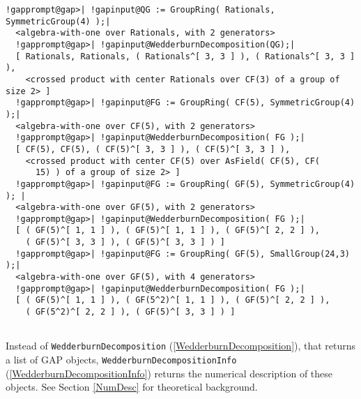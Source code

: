 \documentclass[a4paper,11pt]{report}
\begin{document}
{{\begin{Verbatim}[commandchars=!@|,fontsize=\small,frame=single,label=Example]
  !gapprompt@gap>| !gapinput@QG := GroupRing( Rationals, SymmetricGroup(4) );|
  <algebra-with-one over Rationals, with 2 generators>
  !gapprompt@gap>| !gapinput@WedderburnDecomposition(QG);|
  [ Rationals, Rationals, ( Rationals^[ 3, 3 ] ), ( Rationals^[ 3, 3 ] ),
    <crossed product with center Rationals over CF(3) of a group of size 2> ]
  !gapprompt@gap>| !gapinput@FG := GroupRing( CF(5), SymmetricGroup(4) );|
  <algebra-with-one over CF(5), with 2 generators>
  !gapprompt@gap>| !gapinput@WedderburnDecomposition( FG );|
  [ CF(5), CF(5), ( CF(5)^[ 3, 3 ] ), ( CF(5)^[ 3, 3 ] ),
    <crossed product with center CF(5) over AsField( CF(5), CF(
      15) ) of a group of size 2> ]
  !gapprompt@gap>| !gapinput@FG := GroupRing( GF(5), SymmetricGroup(4) ); |
  <algebra-with-one over GF(5), with 2 generators>
  !gapprompt@gap>| !gapinput@WedderburnDecomposition( FG );|
  [ ( GF(5)^[ 1, 1 ] ), ( GF(5)^[ 1, 1 ] ), ( GF(5)^[ 2, 2 ] ), 
    ( GF(5)^[ 3, 3 ] ), ( GF(5)^[ 3, 3 ] ) ]
  !gapprompt@gap>| !gapinput@FG := GroupRing( GF(5), SmallGroup(24,3) );|
  <algebra-with-one over GF(5), with 4 generators>
  !gapprompt@gap>| !gapinput@WedderburnDecomposition( FG );|
  [ ( GF(5)^[ 1, 1 ] ), ( GF(5^2)^[ 1, 1 ] ), ( GF(5)^[ 2, 2 ] ), 
    ( GF(5^2)^[ 2, 2 ] ), ( GF(5)^[ 3, 3 ] ) ]
  
\end{Verbatim}
 Instead of \texttt{WedderburnDecomposition} (\ref{WedderburnDecomposition}), that returns a list of \textsf{GAP} objects, \texttt{WedderburnDecompositionInfo} (\ref{WedderburnDecompositionInfo}) returns the numerical description of these objects. See Section \ref{NumDesc} for theoretical background. }

 }

  
\end{document}
